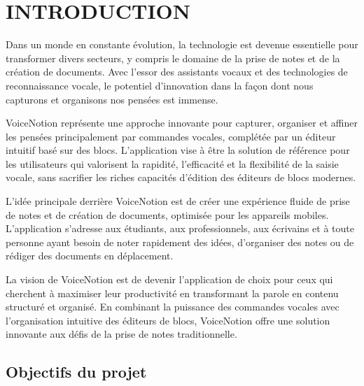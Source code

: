 
\chapter*{INTRODUCTION}
\thispagestyle{fancy}

\vspace{1cm}

Dans un monde en constante évolution, la technologie est devenue essentielle pour transformer divers secteurs, y compris le domaine de la prise de notes et de la création de documents. Avec l'essor des assistants vocaux et des technologies de reconnaissance vocale, le potentiel d'innovation dans la façon dont nous capturons et organisons nos pensées est immense.

VoiceNotion représente une approche innovante pour capturer, organiser et affiner les pensées principalement par commandes vocales, complétée par un éditeur intuitif basé sur des blocs. L'application vise à être la solution de référence pour les utilisateurs qui valorisent la rapidité, l'efficacité et la flexibilité de la saisie vocale, sans sacrifier les riches capacités d'édition des éditeurs de blocs modernes.

\vspace{0.5cm}

L'idée principale derrière VoiceNotion est de créer une expérience fluide de prise de notes et de création de documents, optimisée pour les appareils mobiles. L'application s'adresse aux étudiants, aux professionnels, aux écrivains et à toute personne ayant besoin de noter rapidement des idées, d'organiser des notes ou de rédiger des documents en déplacement.

\vspace{0.5cm}

La vision de VoiceNotion est de devenir l'application de choix pour ceux qui cherchent à maximiser leur productivité en transformant la parole en contenu structuré et organisé. En combinant la puissance des commandes vocales avec l'organisation intuitive des éditeurs de blocs, VoiceNotion offre une solution innovante aux défis de la prise de notes traditionnelle.

\vspace{1cm}

\section*{Objectifs du projet}

